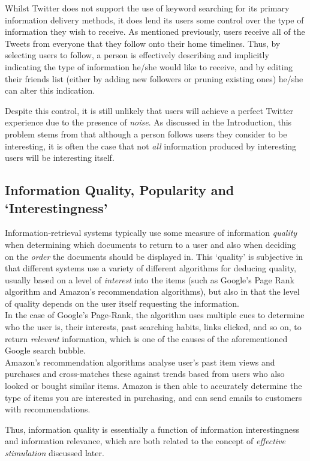 Whilst Twitter does not support the use of keyword searching for its primary information delivery methods, it does lend its users some control over the type of information they wish to receive. As mentioned previously, users receive all of the Tweets from everyone that they follow onto their home timelines. Thus, by selecting users to follow, a person is effectively describing and implicitly indicating the type of information he/she would like to receive, and by editing their friends list (either by adding new followers or pruning existing ones) he/she can alter this indication.

Despite this control, it is still unlikely that users will achieve a perfect Twitter experience due to the presence of \textit{noise}. As discussed in the Introduction, this problem stems from that although a person follows users they consider to be interesting, it is often the case that not \textit{all} information produced by interesting users will be interesting itself.


\subsection{Information Quality, Popularity and `Interestingness'}
Information-retrieval systems typically use some measure of information \textit{quality} when determining which documents to return to a user and also when deciding on the \textit{order} the documents should be displayed in. This `quality' is subjective in that different systems use a variety of different algorithms for deducing quality, usually based on a level of \textit{interest} into the items (such as Google's Page Rank algorithm and Amazon's recommendation algorithms), but also in that the level of quality depends on the user itself requesting the information. \\
In the case of Google's Page-Rank, the algorithm uses multiple cues to determine who the user is, their interests, past searching habits, links clicked, and so on, to return \textit{relevant} information, which is one of the causes of the aforementioned Google search bubble.\\
Amazon's recommendation algorithms analyse user's past item views and purchases and cross-matches these against trends based from users who also looked or bought similar items. Amazon is then able to accurately determine the type of items you are interested in purchasing, and can send emails to customers with recommendations.

Thus, information quality is essentially a function of information interestingness and information relevance, which are both related to the concept of \textit{effective stimulation} \cite{xu07} discussed later.


